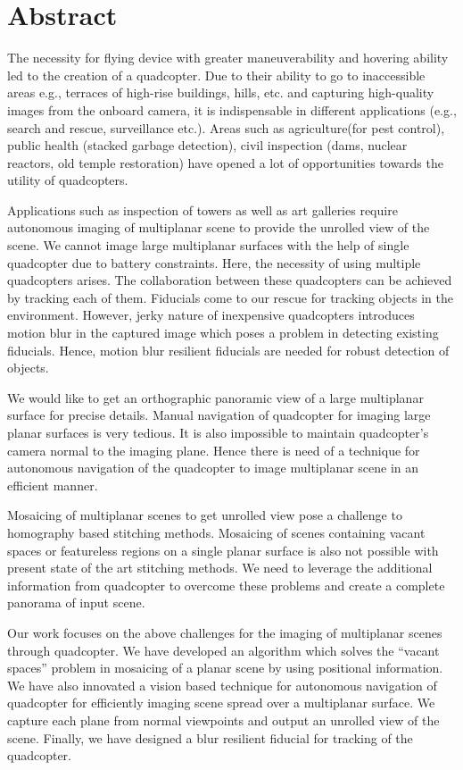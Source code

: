 \chapter*{Abstract}
The necessity for flying device with greater maneuverability and hovering
ability led to the creation of a quadcopter.  Due to their ability to go to
inaccessible areas e.g., terraces of high-rise buildings, hills, etc. and
capturing high-quality images from the onboard camera, it is indispensable in
different applications (e.g., search and rescue,  surveillance etc.).
Areas such as agriculture(for pest control), public health (stacked garbage
detection), civil inspection (dams, nuclear reactors, old temple restoration)
have opened a lot of opportunities towards the utility of quadcopters.

Applications such as inspection of towers as well as art galleries require
autonomous imaging of multiplanar scene to provide the unrolled view of the
scene. We cannot image large multiplanar surfaces with the help of single
quadcopter due to battery constraints. Here, the necessity of using multiple
quadcopters arises. The collaboration between these quadcopters can be achieved
by tracking each of them. Fiducials come to our rescue for tracking objects in
the environment. However, jerky nature of inexpensive quadcopters introduces
motion blur in the captured image which poses a problem in detecting existing
fiducials. Hence, motion blur resilient fiducials are needed for robust
detection of objects.

We would like to get an orthographic panoramic view of a large
multiplanar surface for precise details. Manual navigation of quadcopter for
imaging large planar surfaces is very tedious. It is also impossible to
maintain quadcopter's camera normal to the imaging plane. Hence there is need
of a technique for autonomous navigation of the quadcopter to image
multiplanar scene in an efficient manner.

Mosaicing of multiplanar scenes to get unrolled view pose a challenge to
homography based stitching methods. Mosaicing of scenes containing vacant
spaces or featureless regions on a single planar surface is also not possible
with present state of the art stitching methods. We need to leverage the
additional information from quadcopter to overcome these problems and create
a complete panorama of input scene.

Our work focuses on the above challenges for the imaging of multiplanar scenes
through quadcopter. We have developed an algorithm which solves the ``vacant
spaces'' problem in mosaicing of a planar scene by using positional information.
We have also innovated a vision based technique for autonomous navigation of
quadcopter for efficiently imaging scene spread over a multiplanar surface. We
capture each plane from normal viewpoints and output an unrolled view of the
scene. Finally, we have designed a blur resilient fiducial for tracking of
the quadcopter.